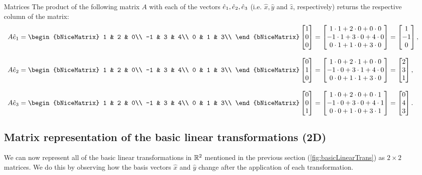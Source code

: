 \begin{example}{Matrices}{}
	The product of the following matrix $A$ with each of the vectors $\hat{e}_{1},\hat{e}_{2},\hat{e}_{3}$ (i.e. $\hat{x},\hat{y}$ and $\hat{z}$, respectively) returns the respective column of the matrix:
	\begin{align*}
		A\eb{1}=
		\begin{bNiceMatrix}
			 1 & 2 & 0\\
			-1 & 3 & 4\\
			 0 & 1 & 3\\
		 \end{bNiceMatrix}\colvec{1;0;0} &= \colvec{1\cdot1+2\cdot0+0\cdot0;-1\cdot1+3\cdot0+4\cdot0;0\cdot1+1\cdot0+3\cdot0} = \colvec{1;-1;0},\\[3mm]
		A\eb{2}=
		\begin{bNiceMatrix}
			 1 & 2 & 0\\
			-1 & 3 & 4\\
			 0 & 1 & 3\\
		\end{bNiceMatrix}\colvec{0;1;0} &= \colvec{1\cdot0+2\cdot1+0\cdot0;-1\cdot0+3\cdot1+4\cdot0;0\cdot0+1\cdot1+3\cdot0} = \colvec{2;3;1},\\[3mm]
		A\eb{3}=
		\begin{bNiceMatrix}
			 1 & 2 & 0\\
			-1 & 3 & 4\\
			 0 & 1 & 3\\
		\end{bNiceMatrix}\colvec{0;0;1} &= \colvec{1\cdot0+2\cdot0+0\cdot1;-1\cdot0+3\cdot0+4\cdot1;0\cdot0+1\cdot0+3\cdot1} = \colvec{0;4;3}.
	\end{align*}
\end{example}

\subsection{Matrix representation of the basic linear transformations (2D)}
We can now represent all of the basic linear transformations in $\mathbb{R}^{2}$ mentioned in the previous section (\autoref{fig:basicLinearTrans}) as $2\times2$ matrices. We do this by observing how the basis vectors $\hat{x}$ and $\hat{y}$ change after the application of each transformation.

